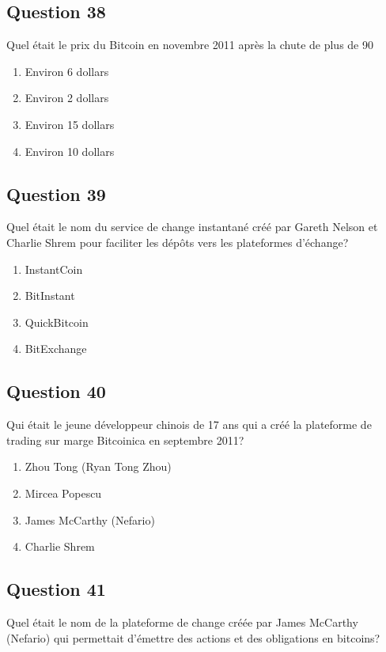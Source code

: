 \documentclass[12pt,a4paper]{article}
\begin{document}
\bigskip


\subsection*{Question 38}
Quel était le prix du Bitcoin en novembre 2011 après la chute de plus de 90%

\begin{enumerate}[label=\Alph*., leftmargin=*]
\item Environ 6 dollars
\item Environ 2 dollars
\item Environ 15 dollars
\item Environ 10 dollars
\end{enumerate}

\bigskip


\subsection*{Question 39}
Quel était le nom du service de change instantané créé par Gareth Nelson et Charlie Shrem pour faciliter les dépôts vers les plateformes d'échange?

\begin{enumerate}[label=\Alph*., leftmargin=*]
\item InstantCoin
\item BitInstant
\item QuickBitcoin
\item BitExchange
\end{enumerate}

\bigskip


\subsection*{Question 40}
Qui était le jeune développeur chinois de 17 ans qui a créé la plateforme de trading sur marge Bitcoinica en septembre 2011?

\begin{enumerate}[label=\Alph*., leftmargin=*]
\item Zhou Tong (Ryan Tong Zhou)
\item Mircea Popescu
\item James McCarthy (Nefario)
\item Charlie Shrem
\end{enumerate}

\bigskip


\subsection*{Question 41}
Quel était le nom de la plateforme de change créée par James McCarthy (Nefario) qui permettait d'émettre des actions et des obligations en bitcoins?
\end{document}
